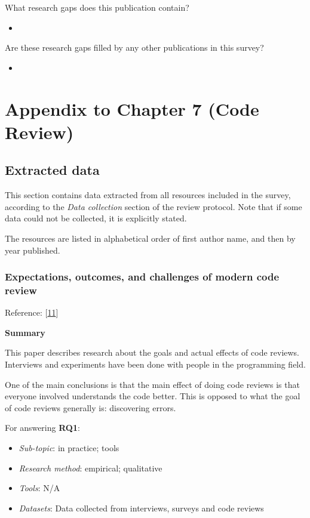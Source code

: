 \documentclass[]{book}
\providecommand{\tightlist}{%
  \setlength{\itemsep}{0pt}\setlength{\parskip}{0pt}}
\begin{document}
What research gaps does this publication contain?

\begin{itemize}
\item
\end{itemize}

Are these research gaps filled by any other publications in this survey?

\begin{itemize}
\item
\end{itemize}

\section{Appendix to Chapter 7 (Code
Review)}\label{appendix-to-chapter-7-code-review}

\subsection{Extracted data}\label{extracted-data}

This section contains data extracted from all resources included in the
survey, according to the \emph{Data collection} section of the review
protocol. Note that if some data could not be collected, it is
explicitly stated.

The resources are listed in alphabetical order of first author name, and
then by year published.

\subsubsection{Expectations, outcomes, and challenges of modern code
review}\label{expectations-outcomes-and-challenges-of-modern-code-review}

Reference: {[}\protect\hyperlink{ref-bacchelli2013expectations}{11}{]}

\textbf{Summary}

This paper describes research about the goals and actual effects of code
reviews. Interviews and experiments have been done with people in the
programming field.

One of the main conclusions is that the main effect of doing code
reviews is that everyone involved understands the code better. This is
opposed to what the goal of code reviews generally is: discovering
errors.

For answering \textbf{RQ1}:

\begin{itemize}
\tightlist
\item
  \emph{Sub-topic}: in practice; tools
\item
  \emph{Research method}: empirical; qualitative
\item
  \emph{Tools}: N/A
\item
  \emph{Datasets}: Data collected from interviews, surveys and code
  reviews
\end{itemize}
\end{document}
